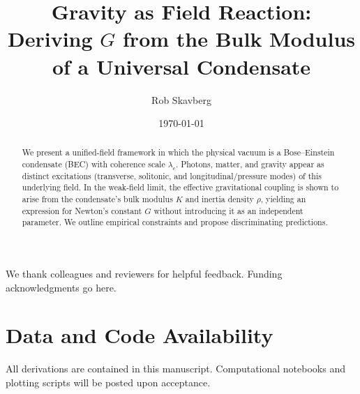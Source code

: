 \documentclass[preprint,onecolumn,longbibliography]{revtex4-2}
\begin{document}
\title{Gravity as Field Reaction: Deriving $G$ from the Bulk Modulus of a Universal Condensate}
\author{Rob Skavberg}
\date{\today}
\begin{abstract}
We present a unified-field framework in which the physical vacuum is a Bose--Einstein condensate (BEC) with coherence scale $\lambda_c$. Photons, matter, and gravity appear as distinct excitations (transverse, solitonic, and longitudinal/pressure modes) of this underlying field. In the weak-field limit, the effective gravitational coupling is shown to arise from the condensate's bulk modulus $K$ and inertia density $\rho$, yielding an expression for Newton's constant $G$ without introducing it as an independent parameter. We outline empirical constraints and propose discriminating predictions.
\end{abstract}
\maketitle






\begin{acknowledgments}
We thank colleagues and reviewers for helpful feedback. Funding acknowledgments go here.
\end{acknowledgments}
\section*{Data and Code Availability}
All derivations are contained in this manuscript. Computational notebooks and plotting scripts will be posted upon acceptance.


\end{document}
